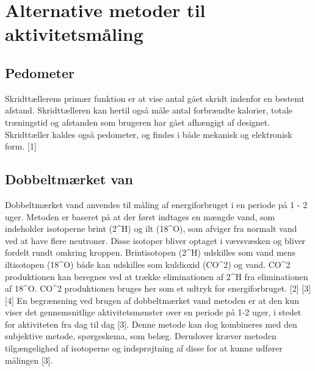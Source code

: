 \section{Alternative metoder til aktivitetsmåling}

\subsection{Pedometer}
Skridttællerens primær funktion er at vise antal gået skridt indenfor en bestemt afstand.
Skridttælleren kan hertil også måle antal forbrændte kalorier, totale træningstid og afstanden
som brugeren har gået afhængigt af designet. Skridttæller kaldes også pedometer, og findes i
både mekanisk og elektronisk form. [1]

\subsection{Dobbeltmærket van}
Dobbeltmærket vand anvendes til måling af energiforbruget i en periode på 1 - 2 uger. Metoden er baseret på at der først indtages en mængde vand, som indeholder isotoperne brint (2^H) og ilt (18^O), som afviger fra normalt vand ved at have flere neutroner. Disse isotoper bliver optaget i vævsvæsken og bliver fordelt rundt omkring kroppen. Brintisotopen (2^H) udskilles som vand mens iltisotopen (18^O) både kan udskilles som kuldioxid (CO^2) og vand. CO^2 produktionen kan beregnes ved at trække eliminationen af 2^H fra eliminationen af 18^O. CO^2 produktionen bruges her som et udtryk for energiforbruget. [2] [3] [4] 
En begrænsning ved brugen af dobbeltmærket vand metoden er at den kun viser det gennemsnitlige aktivitetsmønster over en periode på 1-2 uger, i stedet for aktiviteten fra dag til dag [3]. Denne metode kan dog kombineres med den subjektive metode, spørgeskema, som belæg. Derudover kræver metoden tilgængelighed af isotoperne og indsprøjtning af disse for at kunne udfører målingen [3].

